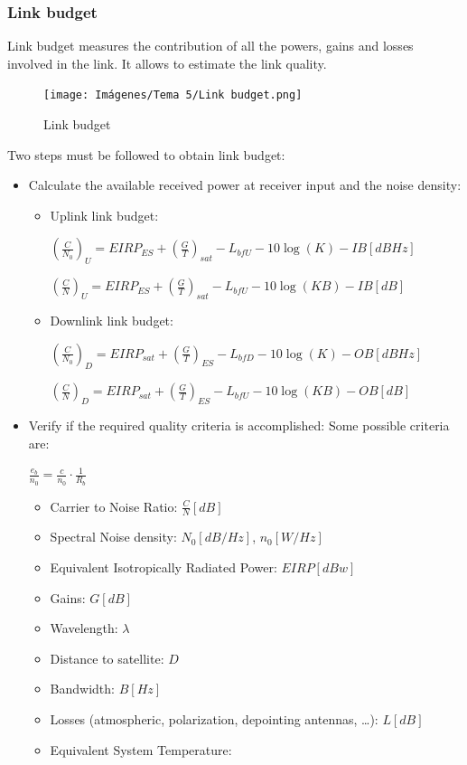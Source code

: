 \documentclass[
	12pt,
	twoside
]{book}
\begin{document}
\subsubsection{Link budget}

Link budget measures the contribution of all the powers, gains and losses involved in the link. It allows to estimate the link quality.

\begin{figure}[H]
	\centering
	\texttt{[image: Imágenes/Tema 5/Link budget.png]}
	\caption{
		\label{fig:unit5_link_budget}
		Link budget
	}
\end{figure}

Two steps must be followed to obtain link budget:
\begin{itemize}
	\item {
		Calculate the available received power at receiver input and the noise density:
		\begin{itemize}
			\item {
				Uplink link budget:

				$\left( \frac {C} {N_0} \right)_U = EIRP_{ES} + \left( \frac {G} {T} \right)_{sat} - L_{bfU} - 10 \log(K) - IB [dBHz]$

				$\left( \frac {C} {N} \right)_U = EIRP_{ES} + \left( \frac {G} {T} \right)_{sat} - L_{bfU} - 10 \log(KB) - IB [dB]$
			}
			\item {
				Downlink link budget:

				$\left( \frac {C} {N_0} \right)_D = EIRP_{sat} + \left( \frac {G} {T} \right)_{ES} - L_{bfD} - 10 \log(K) - OB [dBHz]$

				$\left( \frac {C} {N} \right)_D = EIRP_{sat} + \left( \frac {G} {T} \right)_{ES} - L_{bfU} - 10 \log(KB) - OB [dB]$
			}
		\end{itemize}
	}
	\item {
		Verify if the required quality criteria is accomplished:
		Some possible criteria are:

		$\frac {e_b} {n_0} = \frac {c} {n_0} \cdot \frac {1} {R_b}$

		\begin{itemize}
			\item Carrier to Noise Ratio: $\frac {C} {N} [dB]$
			\item Spectral Noise density: $N_0 [dB/Hz]$, $n_0 [W/Hz]$
			\item Equivalent Isotropically Radiated Power: $EIRP [dBw]$
			\item Gains: $G [dB]$
			\item Wavelength: $\lambda$
			\item Distance to satellite: $D$
			\item Bandwidth: $B [Hz]$
			\item Losses (atmospheric, polarization, depointing antennas, \ldots): $L [dB]$
			\item {
				Equivalent System Temperature:

}
\end{itemize}}
\end{itemize}
\end{document}
